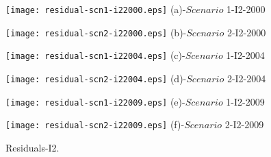 \documentclass[Journal]{ascelike}
\begin{document}
\begin{figure}
 \begin{minipage}[h]{0.5\linewidth}
        \centering
        \texttt{[image: residual-scn1-i22000.eps]}
				\footnotesize{(a)-$Scenario$ 1-I2-2000}
     \end{minipage}
\vspace{3.00mm}
    \begin{minipage}[h]{0.5\linewidth}
       \centering
       \texttt{[image: residual-scn2-i22000.eps]}
			\footnotesize{(b)-$Scenario$ 2-I2-2000}
     \end{minipage}
\vspace{3.00mm} 
    \begin{minipage}[h]{0.5\linewidth}
        \centering
        \texttt{[image: residual-scn1-i22004.eps]}
				\footnotesize{(c)-$Scenario$ 1-I2-2004}
     \end{minipage}
\vspace{3.00mm}
    \begin{minipage}[h]{0.5\linewidth}
       \centering
       \texttt{[image: residual-scn2-i22004.eps]}
			\footnotesize{(d)-$Scenario$ 2-I2-2004}
     \end{minipage}
\vspace{3.00mm}
    \begin{minipage}[h]{0.5\linewidth}
       \centering
       \texttt{[image: residual-scn1-i22009.eps]}
			\footnotesize{(e)-$Scenario$ 1-I2-2009}
     \end{minipage}
\vspace{3.00mm}
    \begin{minipage}[h]{0.5\linewidth}
       \centering
       \texttt{[image: residual-scn2-i22009.eps]}
			\footnotesize{(f)-$Scenario$ 2-I2-2009}
     \end{minipage}
		\caption{Residuals-I2.}
\label{fig6}
\end{figure}
\end{document}
